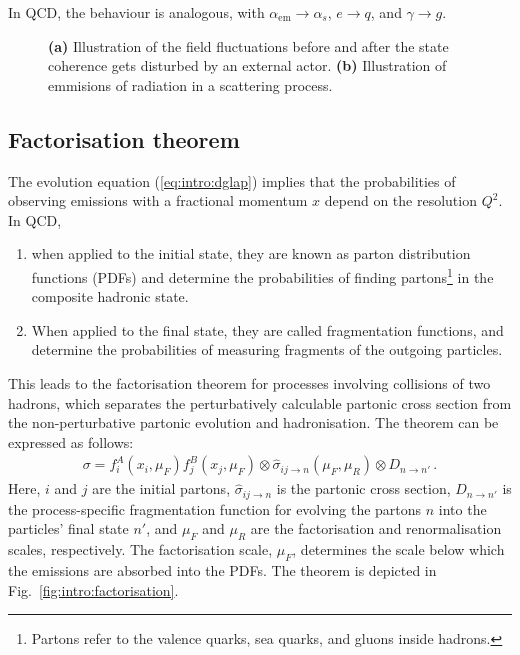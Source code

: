 In QCD, the behaviour is analogous, with $\alpha_\mathrm{em} \rightarrow \alpha_s$, $e\rightarrow q$, and $\gamma \rightarrow g$. \cite{prestelParticlePhysicsPhenomenology}

\begin{figure}[H]
\caption{\textbf{(a)} Illustration of the field fluctuations before and after the state coherence gets disturbed by an external actor. \textbf{(b)} Illustration of emmisions of radiation in a scattering process.}
\label{fig:intro:isrfsrsketch}
\end{figure}

\subsection{Factorisation theorem}

The evolution equation (\ref{eq:intro:dglap}) implies that the probabilities of observing emissions with a fractional momentum $x$ depend on the resolution $Q^2$. In QCD, 
\begin{enumerate}
\item when applied to the initial state, they are known as parton distribution functions (PDFs) and determine the probabilities of finding partons\footnote{Partons refer to the valence quarks, sea quarks, and gluons inside hadrons.} in the composite hadronic state. 
\item When applied to the final state, they are called fragmentation functions, and determine the probabilities of measuring fragments of the outgoing particles.
\end{enumerate}

This leads to the factorisation theorem \cite{collinsFactorizationHardProcesses2004} for processes involving collisions of two hadrons, which separates the perturbatively calculable partonic cross section from the non-perturbative partonic evolution and hadronisation. The theorem can be expressed as follows:
\begin{align}\label{eq:intro:facto}
\sigma = f_i^A(x_i,\mu_F)f_j^B(x_j,\mu_F) \otimes \hat{\sigma}_{ij\to n}(\mu_F,\mu_R) \otimes D_{n \to n'} \, .
\end{align}
Here, $i$ and $j$ are the initial partons, $\hat{\sigma}_{ij\to n}$ is the partonic cross section, $D_{n \to n'}$ is the process-specific fragmentation function for evolving the partons $n$ into the particles' final state $n'$, and $\mu_F$ and $\mu_R$ are the factorisation and renormalisation scales, respectively. The factorisation scale, $\mu_F$, determines the scale below which the emissions are absorbed into the PDFs. The theorem is depicted in Fig.~\ref{fig:intro:factorisation}.

